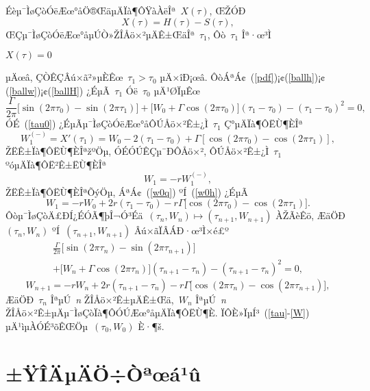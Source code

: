 \documentclass[12pt,openany,CJK,oneside]{cctbook}
\begin{document}
{Éèµ¯ÌøÇòÓëÆœ°åÖ®ŒäµÄÏà¶ÔŸàÀëÎª\ $X(\tau)$, ŒŽÓÐ
\begin{equation}\label{ballH}
  X(\tau)=H(\tau)-S(\tau),
\end{equation}
ŒÇµ¯ÌøÇòÓëÆœ°åµÚÒ»ŽÎÅö×²µÄÊ±ŒäÎª\ $\tau_1$, Ôò\ $\tau_1$ Îª·œ³Ì
\begin{center}
$X(\tau)=0$
\end{center}
µÄœâ, ÇÒÊÇÂú×ã²»µÈÊœ\ $\tau_1>\tau_0$ µÄ×îÐ¡œâ.
ÔòÁªÁ¢\ (\ref{pdf})¡¢(\ref{ballh})¡¢(\ref{ballw})¡¢(\ref{ballH}) ¿ÉµÃ\ $\tau_1$ Óë\ $\tau_0$ µÄ¹ØÏµÊœ
\begin{equation}\label{tau0}
\frac{\Gamma}{2\pi}\big[\sin(2\pi\tau_{0})-\sin(2\pi\tau_{1})\big]+\big[W_{0}+\Gamma\cos(2\pi\tau_{0})\big](\tau_{1}-\tau_{0})-(\tau_{1}-\tau_{0})^{2}=0,
\end{equation}
ÓÉ\ (\ref{tau0}) ¿ÉµÃµ¯ÌøÇòÓëÆœ°åÔÚÅö×²Ê±¿Ì\ $\tau_1$ Ç°µÄÏà¶ÔËÙ¶ÈÎª
\begin{equation}\label{w0q}
  W^{(-)}_1=X'(\tau_1)=W_0-2(\tau_1-\tau_0)+\Gamma[\cos(2\pi\tau_0)-\cos(2\pi\tau_1)],
\end{equation}
ŽËÊ±Ïà¶ÔËÙ¶ÈÎªžºÖµ, ÓÉÓÚÊÇµ¯ÐÔÅö×², ÔÚÅö×²Ê±¿Ì\ $\tau_1$ ºóµÄÏà¶ÔË²Ê±ËÙ¶ÈÎª
\begin{equation}\label{w0h}
   W_1=-rW^{(-)}_1,
\end{equation}
ŽËÊ±Ïà¶ÔËÙ¶ÈÎªÕýÖµ, ÁªÁ¢\ (\ref{w0q}) ºÍ\ (\ref{w0h}) ¿ÉµÃ
\begin{equation}\label{w0}
   W_{1}=-rW_{0}+2r(\tau_{1}-\tau_{0})-r\Gamma\big[\cos(2\pi\tau_{0})-\cos(2\pi\tau_{1})\big].
\end{equation}
Ôòµ¯ÌøÇòÄ£ÐÍ¿ÉÓÃ¶þÎ¬Ó³Éä\ $(\tau_n,W_n)\mapsto (\tau_{n+1},W_{n+1})$ ÀŽÃèÊö, ÆäÖÐ\ $(\tau_n,W_n)$ ºÍ\ $(\tau_{n+1},W_{n+1})$ Âú×ãÏÂÁÐ·œ³Ì×é£º
\begin{multline}\label{tau}
 \frac{\Gamma}{2\pi}\big[\sin(2\pi\tau_{n})-\sin(2\pi\tau_{n+1})\big]\\
 +\big[W_{n}+\Gamma\cos(2\pi\tau_{n})\big](\tau_{n+1}-\tau_{n})-(\tau_{n+1}-\tau_{n})^{2}=0,
\end{multline}
\begin{equation}\label{W}
  W_{n+1}=-rW_{n}+2r(\tau_{n+1}-\tau_{n})-r\Gamma\big[\cos(2\pi\tau_{n})-\cos(2\pi\tau_{n+1})\big],
\end{equation}
ÆäÖÐ\ $\tau_n$ ÎªµÚ\ \emph{n} ŽÎÅö×²Ê±µÄÊ±Œä,\ $W_n$ ÎªµÚ\ \emph{n} ŽÎÅö×²Ê±µÄµ¯ÌøÇòÏà¶ÔÓÚÆœ°åµÄÏà¶ÔËÙ¶È. ÏÔÈ»ÏµÍ³\ (\ref{tau}-\ref{W}) µÄ¹ìµÀÓÉ³õÊŒÖµ\ $(\tau_0,W_0)$ È·¶š.
\section{\kaishu ±ŸÎÄµÄÖ÷Òªœá¹û}

}
\end{document}

